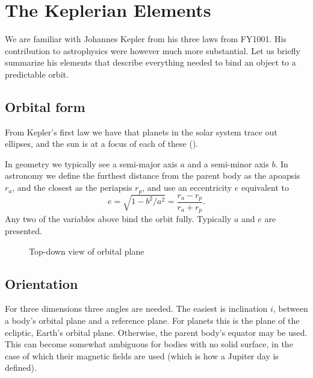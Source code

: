 \section{The Keplerian Elements}
We are familiar with Johannes Kepler from his three laws from FY1001. His contribution to astrophysics were however much more substantial. Let us briefly summarize his elements that describe everything needed to bind an object to a predictable orbit.

\subsection{Orbital form}
From Kepler's first law we have that planets in the solar system trace out ellipses, and the sun is at a focus of each of these (\cite{Kepler_1609}).

In geometry we typically see a semi-major axis $a$ and a semi-minor axis $b$. In astronomy we define the furthest distance from the parent body as the apoapsis $r_a$, and the closest as the periapsis $r_p$, and use an eccentricity $e$ equivalent to
\[
    e = \sqrt{1 - b^2/a^2} = \frac{r_a - r_p}{r_a + r_p}.
\]
Any two of the variables above bind the orbit fully. Typically $a$ and $e$ are presented.


\begin{figure}[h]
    \centering
    \caption{Top-down view of orbital plane}
    \label{fig:enter-label}
\end{figure}

\subsection{Orientation}
For three dimensions three angles are needed. The easiest is inclination $i$, between a body's orbital plane and a reference plane. For planets this is the plane of the ecliptic, Earth's orbital plane. Otherwise, the parent body's equator may be used. This can become somewhat ambiguous for bodies with no solid surface, in the case of which their magnetic fields are used (which is how a Jupiter day is defined).

